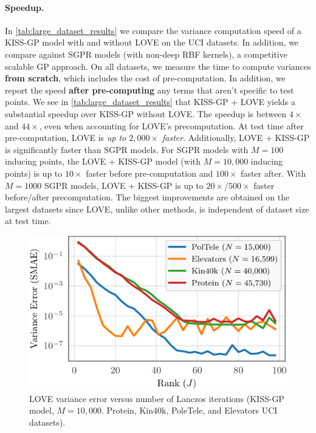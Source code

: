 \paragraph{Speedup.}
In \cref{tab:large_dataset_results} we compare the variance computation speed of a KISS-GP model with and without LOVE{} on the UCI datasets.
In addition, we compare against SGPR models (with non-deep RBF kernels), a competitive scalable GP approach.
On all datasets, we measure the time to compute variances {\bf from scratch}, which includes the cost of pre-computation.
In addition, we report the speed {\bf after pre-computing} any terms that aren't specific to test points.
We see in \cref{tab:large_dataset_results} that KISS-GP + LOVE{} yields a substantial speedup over KISS-GP without LOVE{}.
The speedup is between $4\times$ and $44\times$, even when accounting for LOVE{}'s precomputation.
At test time after pre-computation, LOVE{} is \emph{up to $2,\!000\times$ faster}.
Additionally, LOVE + KISS-GP{} is significantly faster than SGPR models.
For SGPR models with $M=100$ inducing points, the LOVE + KISS-GP{} model (with $M=10,\!000$ inducing points) is up to $10\times$ faster before pre-computation and $100\times$ faster after.
With $M=1000$ SGPR models, LOVE + KISS-GP{} is up to $20\times$/$500\times$ faster before/after precomputation.
The biggest improvements are obtained on the largest datasets since LOVE{}, unlike other methods, is independent of dataset size at test time.

\begin{figure}[t!]
  \centering
  \includegraphics[width=0.65\columnwidth]{figures/lanczos_accuracy.pdf}
  \vspace{-2ex}
  \caption[LOVE variance error versus number of Lanczos iterations.]{
    LOVE variance error versus number of Lanczos iterations
    (KISS-GP model, $M=10,\!000$. Protein, Kin40k, PoleTele, and Elevators UCI datasets).
    \label{fig:lanczos_accuracy}
  }
  \vspace{-1ex}
\end{figure}

